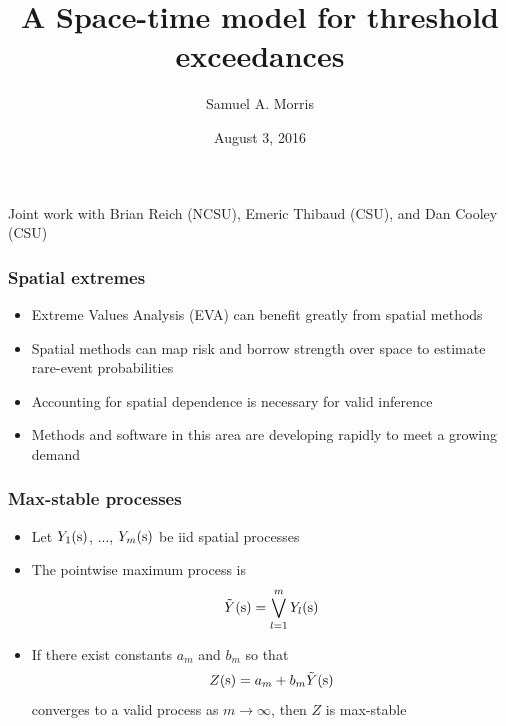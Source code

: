 \documentclass{beamer}
\title[\Skewt model for threshold exceedances]{A Space-time \skewt model for threshold exceedances}
\author[S. Morris]{Samuel A. Morris}
\institute[]{North Carolina State University}
\date[]{August 3, 2016}
\renewcommand{\bs}{ \mbox{\boldmath s}}
\newcommand{\bit}{\begin{itemize}}
\newcommand{\eit}{\end{itemize}}
\begin{document}
\begin{frame}
  \titlepage


\begin{center}
   Joint work with Brian Reich (NCSU), Emeric Thibaud (CSU), and Dan Cooley (CSU)
\end{center}
\end{frame}






\begin{frame}\frametitle{Spatial extremes}
 \bit\setlength\itemsep{\fill}
  \item Extreme Values Analysis (EVA) can benefit greatly from spatial methods
  \item Spatial methods can map risk and borrow strength over space to estimate rare-event probabilities
  \item Accounting for spatial dependence is necessary for valid inference
  \item Methods and software in this area are developing rapidly to meet a growing demand
 \eit
\end{frame}

\begin{frame}\frametitle{Max-stable processes}
  \bit\setlength\itemsep{\fill}
  \item Let $Y_1(\bs)$, ..., $Y_m(\bs)$ be iid spatial processes
  \item The pointwise maximum process is $${\tilde Y}(\bs) =\bigvee_{l=1}^m Y_l(\bs)$$
  \item If there exist constants $a_m$ and $b_m$ so that $$Z(\bs)= a_m + b_m {\tilde Y}(\bs)$$
  converges to a valid process as $m\rightarrow\infty$, then $Z$ is max-stable
  \eit
\end{frame}
\end{document}
